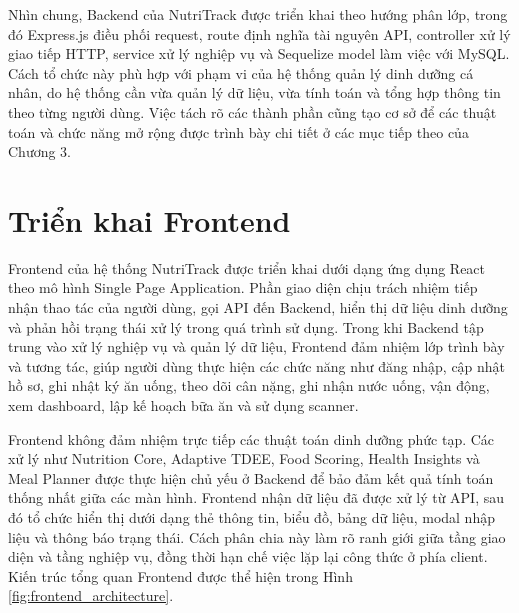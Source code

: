 \documentclass[12pt, a4paper]{report}
\begin{document}
Nhìn chung, Backend của NutriTrack được triển khai theo hướng phân lớp, trong đó Express.js điều phối request, route định nghĩa tài nguyên API, controller xử lý giao tiếp HTTP, service xử lý nghiệp vụ và Sequelize model làm việc với MySQL. Cách tổ chức này phù hợp với phạm vi của hệ thống quản lý dinh dưỡng cá nhân, do hệ thống cần vừa quản lý dữ liệu, vừa tính toán và tổng hợp thông tin theo từng người dùng. Việc tách rõ các thành phần cũng tạo cơ sở để các thuật toán và chức năng mở rộng được trình bày chi tiết ở các mục tiếp theo của Chương 3.

\section{Triển khai Frontend}Frontend của hệ thống NutriTrack được triển khai dưới dạng ứng dụng React theo mô hình Single Page Application. Phần giao diện chịu trách nhiệm tiếp nhận thao tác của người dùng, gọi API đến Backend, hiển thị dữ liệu dinh dưỡng và phản hồi trạng thái xử lý trong quá trình sử dụng. Trong khi Backend tập trung vào xử lý nghiệp vụ và quản lý dữ liệu, Frontend đảm nhiệm lớp trình bày và tương tác, giúp người dùng thực hiện các chức năng như đăng nhập, cập nhật hồ sơ, ghi nhật ký ăn uống, theo dõi cân nặng, ghi nhận nước uống, vận động, xem dashboard, lập kế hoạch bữa ăn và sử dụng scanner.

Frontend không đảm nhiệm trực tiếp các thuật toán dinh dưỡng phức tạp. Các xử lý như Nutrition Core, Adaptive TDEE, Food Scoring, Health Insights và Meal Planner được thực hiện chủ yếu ở Backend để bảo đảm kết quả tính toán thống nhất giữa các màn hình. Frontend nhận dữ liệu đã được xử lý từ API, sau đó tổ chức hiển thị dưới dạng thẻ thông tin, biểu đồ, bảng dữ liệu, modal nhập liệu và thông báo trạng thái. Cách phân chia này làm rõ ranh giới giữa tầng giao diện và tầng nghiệp vụ, đồng thời hạn chế việc lặp lại công thức ở phía client. Kiến trúc tổng quan Frontend được thể hiện trong Hình \ref{fig:frontend_architecture}.
\end{document}
